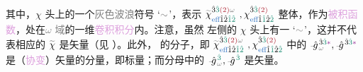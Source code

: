 其中，$\chi$ 头上的一个\textcolor{gray}{灰色波浪}符号 `$\mathcolor{gray}{\sim}$'，表示 $\textcolor{gray}{\widetilde{\textcolor{black}{\chi}}}^{ \hat{3} \textcolor{PineGreen}{\hat{3}} \textcolor{Maroon}{(2)} \mathcolor{gray}{\omega} }_{ \textcolor{NavyBlue}{\text{eff}} \hat{1} \hat{2} \textcolor{PineGreen}{\hat{1} \hat{2}} }~, {\chi}^{\hat{3} \textcolor{PineGreen}{\hat{3}} \textcolor{Maroon}{(2)} }_{\textcolor{NavyBlue}{\text{eff}} \hat{1} \textcolor{PineGreen}{\hat{1}} \hat{2} \textcolor{PineGreen}{\hat{2}} }$ 整体，作为\textcolor{Plum}{被积函数}，处在\textcolor{gray}{$\omega$ 域}的一维\textcolor{Plum}{卷积积分}内。注意，虽然  左侧的 $\chi$ 头上有一 `$\mathcolor{gray}{\sim}$'，这并不代表相应的 $\textcolor{gray}{\widetilde{\textcolor{black}{\chi}}}$ 是矢量（见 ）。此外， 的分子，即 $\textcolor{gray}{\widetilde{\textcolor{black}{\chi}}}^{ \hat{3} \textcolor{PineGreen}{\hat{3}} \textcolor{Maroon}{(2)} \mathcolor{gray}{\omega} }_{ \textcolor{NavyBlue}{\text{eff}} \hat{1} \hat{2} \textcolor{PineGreen}{\hat{1} \hat{2}} }~, {\chi}^{\hat{3} \textcolor{PineGreen}{\hat{3}} \textcolor{Maroon}{(2)} }_{\textcolor{NavyBlue}{\text{eff}} \hat{1} \textcolor{PineGreen}{\hat{1}} \hat{2} \textcolor{PineGreen}{\hat{2}} }$ 中的 $\xint{{}^{}_{\mathcolor{gray}{-}}}{10}{\hat{g}}^{\;\! \hat{3} \textcolor{PineGreen}{\hat{3}} \textcolor{Plum}{*}}_{\;\! \mathcolor{gray}{\omega}}, \xint{{}^{}_{\mathcolor{gray}{-}}}{10}{\hat{g}}^{\;\! \hat{3} \textcolor{PineGreen}{\hat{3}} \textcolor{Plum}{*}}_{\;\! }$ 是（\textcolor{Plum}{协变}）矢量的分量，即标量；而分母中的 $\xint{{}^{}_{\mathcolor{gray}{-}}}{10}{\hat{g}}^{\;\! \textcolor{PineGreen}{\hat{3}}}_{\;\! \mathcolor{gray}{\omega}}, \xint{{}^{}_{\mathcolor{gray}{-}}}{10}{\hat{g}}^{\;\! \textcolor{PineGreen}{\hat{3}}}$ 是矢量。

